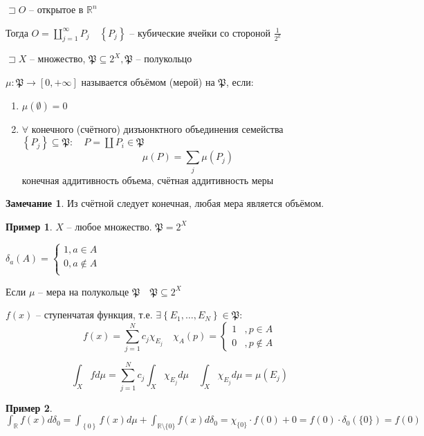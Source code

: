 \documentclass{book}
\newcommand\R{\ensuremath{\mathbb{R}}}
\renewcommand\O{\ensuremath{\emptyset}}
\theoremstyle{definition}
\newtheorem*{note}{Замечание}
\newtheorem*{example}{Пример}
\begin{document}
\begin{theorem}
    $\sqsupset O$ -- открытое в $\R^n$

    Тогда $O = \coprod_{j=1}^{\infty }P_j\quad \left\{ P_j \right\} $ -- кубические ячейки со стороной $\frac{1}{2^k}$
\end{theorem}

\begin{definition}
    $\sqsupset X$ -- множество, $\mathfrak P \subseteq 2^X, \mathfrak P$ -- полукольцо

    $\mu:\mathfrak P \to [0,+\infty ]$ называется объёмом (мерой) на $\mathfrak P$, если:
     \begin{enumerate}
         \item $\mu\left( \O  \right)  = 0$
         \item $\forall $ конечного (счётного) дизъюнктного объединения семейства $\left\{ P_j \right\} \subseteq \mathfrak P:\quad P = \coprod P_i \in \mathfrak P$
             \[\mu(P) = \sum_j \mu(P_j)\] конечная аддитивность объема, счётная аддитивность меры
    \end{enumerate}
\end{definition}

\begin{note}
    Из счётной следует конечная, любая мера является объёмом.
\end{note}

\begin{example}
    $X$ -- любое множество.  $\mathfrak P = 2^X$

    $\delta_a(A) = \begin{cases}
        1, a\in A\\
        0, a\not\in A\\
    \end{cases}$
\end{example}

Если $\mu$ -- мера на полукольце  $\mathfrak P\quad \mathfrak P\subseteq 2^X$

$f(x)$ -- ступенчатая функция, т.е.  $\exists  \left\{ E_1, \ldots, E_N \right\} \in \mathfrak P$: \[f(x) = \sum_{j=1}^{N} c_j\chi_{E_j}\quad \chi_A(p) = 
\begin{cases}
    1&, p\in A\\
    0&,p\not\in A
\end{cases}\]

\[\int_X f d\mu = \sum_{j=1}^{N} c_j \int_X \chi_{E_j}d\mu\quad \int_X \chi_{E_j}d\mu = \mu\left( E_j \right) \]

\begin{example}
    $\int_\R f(x)d\delta_0 = \int_{\left\{ 0 \right\} }f(x)d\mu + \int_{\R\setminus \{0\}}f(x) d\delta_0 = \chi_{\{0\}}\cdot f(0) + 0 = f(0)\cdot \delta_0\left( \{0\} \right) = f\left(0 \right) $
\end{example}
\end{document}

